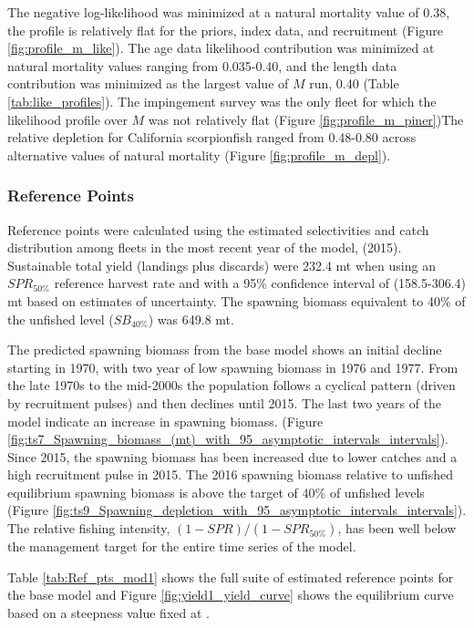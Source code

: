 \documentclass[12pt,]{article}
\begin{document}
The negative log-likelihood was minimized at a natural mortality value
of 0.38, the profile is relatively flat for the priors, index data, and
recruitment (Figure \ref{fig:profile_m_like}). The age data likelihood
contribution was minimized at natural mortality values ranging from
0.035-0.40, and the length data contribution was minimized as the
largest value of \(M\) run, 0.40 (Table \ref{tab:like_profiles}). The
impingement survey was the only fleet for which the likelihood profile
over \(M\) was not relatively flat (Figure \ref{fig:profile_m_piner})The
relative depletion for California scorpionfish ranged from 0.48-0.80
across alternative values of natural mortality (Figure
\ref{fig:profile_m_depl}).

\subsubsection{Reference Points}\label{reference-points-1}

Reference points were calculated using the estimated selectivities and
catch distribution among fleets in the most recent year of the model,
(2015). Sustainable total yield (landings plus discards) were 232.4 mt
when using an \(SPR_{50\%}\) reference harvest rate and with a 95\%
confidence interval of (158.5-306.4) mt based on estimates of
uncertainty. The spawning biomass equivalent to 40\% of the unfished
level (\(SB_{40\%}\)) was 649.8 mt.

The predicted spawning biomass from the base model shows an initial
decline starting in 1970, with two year of low spawning biomass in 1976
and 1977. From the late 1970s to the mid-2000s the population follows a
cyclical pattern (driven by recruitment pulses) and then declines until
2015. The last two years of the model indicate an increase in spawning
biomass. (Figure
\ref{fig:ts7_Spawning_biomass_(mt)_with_95_asymptotic_intervals_intervals}).
Since 2015, the spawning biomass has been increased due to lower catches
and a high recruitment pulse in 2015. The 2016 spawning biomass relative
to unfished equilibrium spawning biomass is above the target of 40\% of
unfished levels (Figure
\ref{fig:ts9_Spawning_depletion_with_95_asymptotic_intervals_intervals}).
The relative fishing intensity, \((1-SPR)/(1-SPR_{50\%})\), has been
well below the management target for the entire time series of the
model.

Table \ref{tab:Ref_pts_mod1} shows the full suite of estimated reference
points for the base model and Figure \ref{fig:yield1_yield_curve} shows
the equilibrium curve based on a steepness value fixed at .
\end{document}
